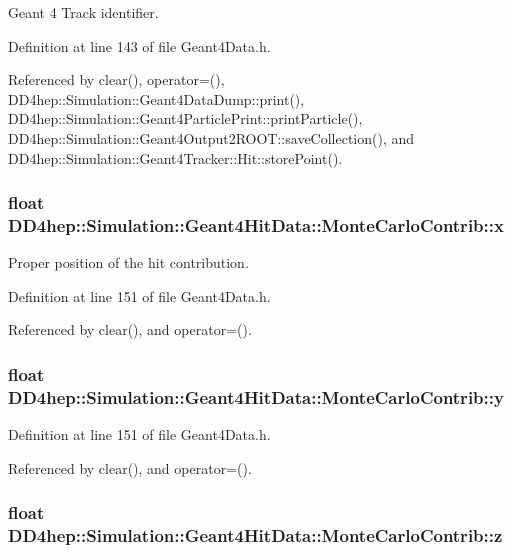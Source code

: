 Geant 4 Track identifier. 

Definition at line 143 of file Geant4Data.h.

Referenced by clear(), operator=(), DD4hep::Simulation::Geant4DataDump::print(), DD4hep::Simulation::Geant4ParticlePrint::printParticle(), DD4hep::Simulation::Geant4Output2ROOT::saveCollection(), and DD4hep::Simulation::Geant4Tracker::Hit::storePoint().\hypertarget{class_d_d4hep_1_1_simulation_1_1_geant4_hit_data_1_1_monte_carlo_contrib_af10634172fe6990ae8f588ba109c1c0f}{
\subsubsection[{x}]{\setlength{\rightskip}{0pt plus 5cm}float {\bf DD4hep::Simulation::Geant4HitData::MonteCarloContrib::x}}}
\label{class_d_d4hep_1_1_simulation_1_1_geant4_hit_data_1_1_monte_carlo_contrib_af10634172fe6990ae8f588ba109c1c0f}


Proper position of the hit contribution. 

Definition at line 151 of file Geant4Data.h.

Referenced by clear(), and operator=().\hypertarget{class_d_d4hep_1_1_simulation_1_1_geant4_hit_data_1_1_monte_carlo_contrib_afc4f5cb38a61ece64df14416ae637cbb}{
\subsubsection[{y}]{\setlength{\rightskip}{0pt plus 5cm}float {\bf DD4hep::Simulation::Geant4HitData::MonteCarloContrib::y}}}
\label{class_d_d4hep_1_1_simulation_1_1_geant4_hit_data_1_1_monte_carlo_contrib_afc4f5cb38a61ece64df14416ae637cbb}


Definition at line 151 of file Geant4Data.h.

Referenced by clear(), and operator=().\hypertarget{class_d_d4hep_1_1_simulation_1_1_geant4_hit_data_1_1_monte_carlo_contrib_ad56f9cc8b369b718c9f85a17bfe43054}{
\subsubsection[{z}]{\setlength{\rightskip}{0pt plus 5cm}float {\bf DD4hep::Simulation::Geant4HitData::MonteCarloContrib::z}}}
\label{class_d_d4hep_1_1_simulation_1_1_geant4_hit_data_1_1_monte_carlo_contrib_ad56f9cc8b369b718c9f85a17bfe43054}


